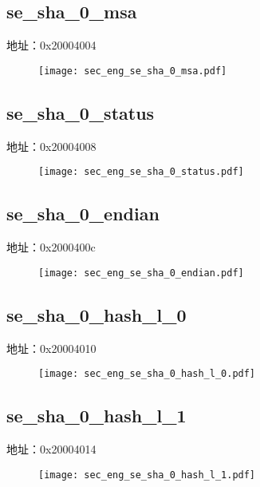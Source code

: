\subsection{se\_sha\_0\_msa}
\label{sec_eng-se-sha-0-msa}
地址：0x20004004
 \begin{figure}[H]
\texttt{[image: sec\_eng\_se\_sha\_0\_msa.pdf]}
\end{figure}

\subsection{se\_sha\_0\_status}
\label{sec_eng-se-sha-0-status}
地址：0x20004008
 \begin{figure}[H]
\texttt{[image: sec\_eng\_se\_sha\_0\_status.pdf]}
\end{figure}

\subsection{se\_sha\_0\_endian}
\label{sec_eng-se-sha-0-endian}
地址：0x2000400c
 \begin{figure}[H]
\texttt{[image: sec\_eng\_se\_sha\_0\_endian.pdf]}
\end{figure}

\subsection{se\_sha\_0\_hash\_l\_0}
\label{sec_eng-se-sha-0-hash-l-0}
地址：0x20004010
 \begin{figure}[H]
\texttt{[image: sec\_eng\_se\_sha\_0\_hash\_l\_0.pdf]}
\end{figure}

\subsection{se\_sha\_0\_hash\_l\_1}
\label{sec_eng-se-sha-0-hash-l-1}
地址：0x20004014
 \begin{figure}[H]
\texttt{[image: sec\_eng\_se\_sha\_0\_hash\_l\_1.pdf]}
\end{figure}

